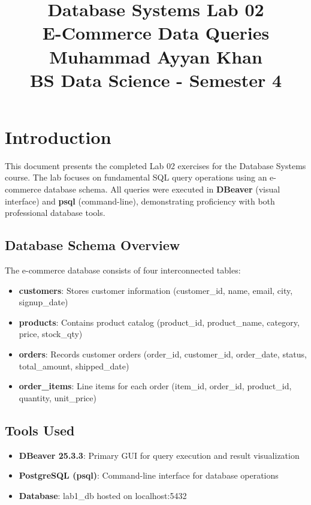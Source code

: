 \documentclass[12pt]{article}
\title{
    {\Huge Database Systems Lab 02}\\
    \vspace{0.5cm}
    {\Large E-Commerce Data Queries}\\
    \vspace{1cm}
    {\large Muhammad Ayyan Khan}\\
    {\large BS Data Science - Semester 4}
}
\author{}
\date{}
\begin{document}
\maketitle

\thispagestyle{fancy}

\section{Introduction}

This document presents the completed Lab 02 exercises for the Database Systems course. The lab focuses on fundamental SQL query operations using an e-commerce database schema. All queries were executed in \textbf{DBeaver} (visual interface) and \textbf{psql} (command-line), demonstrating proficiency with both professional database tools.

\subsection{Database Schema Overview}

The e-commerce database consists of four interconnected tables:

\begin{itemize}
    \item \textbf{customers}: Stores customer information (customer\_id, name, email, city, signup\_date)
    \item \textbf{products}: Contains product catalog (product\_id, product\_name, category, price, stock\_qty)
    \item \textbf{orders}: Records customer orders (order\_id, customer\_id, order\_date, status, total\_amount, shipped\_date)
    \item \textbf{order\_items}: Line items for each order (item\_id, order\_id, product\_id, quantity, unit\_price)
\end{itemize}

\subsection{Tools Used}

\begin{itemize}
    \item \textbf{DBeaver 25.3.3}: Primary GUI for query execution and result visualization
    \item \textbf{PostgreSQL (psql)}: Command-line interface for database operations
    \item \textbf{Database}: lab1\_db hosted on localhost:5432
\end{itemize}
\end{document}
